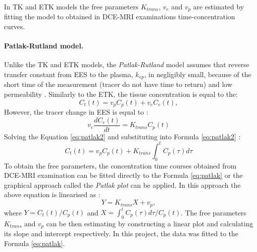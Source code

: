 In TK and ETK models the free parameters $K_{trans}$, $v_e$ and $v_p$ are estimated by fitting the model to obtained in DCE-MRI examinations time-concentration curves.  
\paragraph{Patlak-Rutland model.}
Unlike the TK and ETK models, the \textit{Patlak-Rutland} model \cite{patlak1983graphical} assumes that reverse transfer constant from EES to the plasma, $k_{ep}$, in negligibly small, because of the short time of the measurement (tracer do not have time to return) and low permeability \cite{khalifa2014models}. 
Similarly to the ETK, the tissue concentration is equal to the:
\begin{equation}
C_t(t) = v_pC_p(t) + v_eC_e(t),
\label{eq:patlak1}
\end{equation}
However, the tracer change in EES is equal to \cite{thesis,patlak1983graphical}: 
\begin{equation}
	\label{eq:patlak2}
	v_e\frac{dC_{e}(t)}{dt} = K_{trans}C_p(t)
\end{equation}
Solving the Equation \ref{eq:patlak2} and substituting into Formula \ref{eq:patlak2} \cite{khalifa2014models, patlak1983graphical}: 
\begin{equation}
	\label{eq:patlak}
	C_{t}(t) =v_pC_p(t) + K_{trans}\int_{0}^{t}C_p(\tau)d\tau  
\end{equation}
To obtain the free parameters, the concentration time courses obtained from DCE-MRI examination can be fitted directly to the Formula \ref{eq:patlak} or the graphical approach called the \textit{Patlak plot} can be applied. In this approach the above equation is linearised as \cite{khalifa2014models, patlak1983graphical}:  
\begin{equation}
	\label{eq:patlak_lin}
	Y = K_{trans}X +v_p,  
\end{equation}
where $Y=C_t(t)/C_p(t)$ and $X=\int_{0}^{t}C_p(\tau)d\tau/C_p(t)$. The free parameters $K_{trans}$ and $v_p$ can be then estimating by constructing a linear plot and calculating its slope and intercept respectively.
In this project, the data was fitted to the Formula \ref{eq:patlak}. 
\newpage
